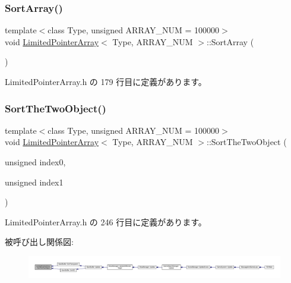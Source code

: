 \subsubsection{\texorpdfstring{Sort\+Array()}{SortArray()}}
{\footnotesize\ttfamily template$<$class Type, unsigned A\+R\+R\+A\+Y\+\_\+\+N\+UM = 100000$>$ \\
void \mbox{\hyperlink{class_limited_pointer_array}{Limited\+Pointer\+Array}}$<$ Type, A\+R\+R\+A\+Y\+\_\+\+N\+UM $>$\+::Sort\+Array (\begin{DoxyParamCaption}{ }\end{DoxyParamCaption})\hspace{0.3cm}{\ttfamily [inline]}}



 Limited\+Pointer\+Array.\+h の 179 行目に定義があります。

\mbox{\label{class_limited_pointer_array_a0d33dc5dd8ed01bb00accd6378aa1b47}} 
\subsubsection{\texorpdfstring{Sort\+The\+Two\+Object()}{SortTheTwoObject()}}
{\footnotesize\ttfamily template$<$class Type, unsigned A\+R\+R\+A\+Y\+\_\+\+N\+UM = 100000$>$ \\
void \mbox{\hyperlink{class_limited_pointer_array}{Limited\+Pointer\+Array}}$<$ Type, A\+R\+R\+A\+Y\+\_\+\+N\+UM $>$\+::Sort\+The\+Two\+Object (\begin{DoxyParamCaption}\item[{unsigned}]{index0,  }\item[{unsigned}]{index1 }\end{DoxyParamCaption})\hspace{0.3cm}{\ttfamily [inline]}}



 Limited\+Pointer\+Array.\+h の 246 行目に定義があります。

被呼び出し関係図\+:
\nopagebreak
\begin{figure}[H]
\begin{center}
\leavevmode
\includegraphics[width=350pt]{class_limited_pointer_array_a0d33dc5dd8ed01bb00accd6378aa1b47_icgraph}
\end{center}
\end{figure}



